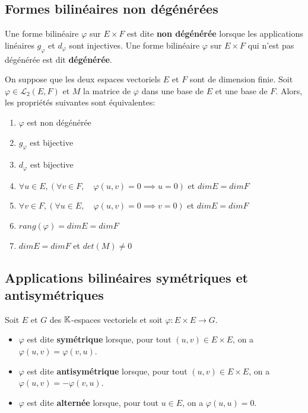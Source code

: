 \documentclass[a4paper, 12pt]{article}
\begin{document}
\subsection{Formes bilinéaires non dégénérées}

\begin{definition}
    Une forme bilinéaire $\varphi$ sur $E \times F$ est dite \textbf{non dégénérée} lorsque les applications linéaires $g_\varphi$ et $d_\varphi$ sont injectives. Une forme bilinéaire $\varphi$ sur $E \times F$ qui n'est pas dégénérée est dit \textbf{dégénérée}.
\end{definition}

\begin{proposition}{}{}
    On suppose que les deux espaces vectoriels $E$ et $F$ sont de dimension finie.
    Soit $\varphi \in \mathcal{L}_2(E, F)$ et $M$ la matrice de $\varphi$ dans une base de $E$ et une base de $F$. Alors, les propriétés suivantes sont équivalentes:
    \begin{enumerate}
        \item $\varphi$ est non dégénérée
        \item $g_\varphi$ est bijective
        \item $d_\varphi$ est bijective
        \item $\forall u \in E, \left( \forall v \in F, \quad \varphi(u, v) = 0 \implies u = 0 \right)$ et $dim E = dim F$
        \item $\forall v \in F, \left( \forall u \in E, \quad \varphi(u, v) = 0 \implies v = 0 \right)$ et $dim E = dim F$
        \item $rang(\varphi) = dim E = dim F$
        \item $dim E = dim F$ et $det(M) \neq 0$
    \end{enumerate}
\end{proposition}

\subsection{Applications bilinéaires symétriques et antisymétriques}

\begin{definition}
    Soit $E$ et $G$ des $\mathbb{K}$-espaces vectoriels et soit $\varphi: E \times E \to G$.
    \begin{itemize}[label=--]
        \item $\varphi$ est dite \textbf{symétrique} lorsque, pour tout $(u, v) \in E \times E$, on a $\varphi(u, v) = \varphi(v, u)$.
        \item $\varphi$ est dite \textbf{antisymétrique} lorsque, pour tout $(u, v) \in E \times E$, on a $\varphi(u, v) = -\varphi(v, u)$.
        \item $\varphi$ est dite \textbf{alternée} lorsque, pour tout $u \in E$, on a $\varphi(u, u) = 0$.
    \end{itemize}
\end{definition}
\end{document}
